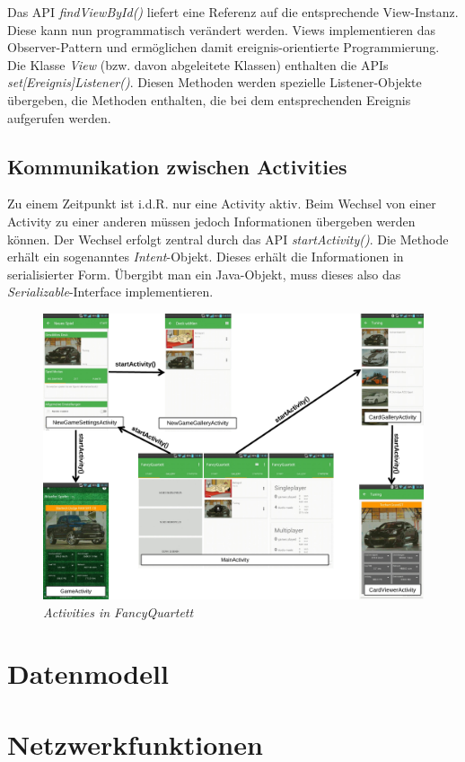 Das API \emph{findViewById()} liefert eine Referenz auf die entsprechende View-Instanz. Diese kann nun programmatisch verändert werden. Views implementieren das Observer-Pattern und ermöglichen damit ereignis-orientierte Programmierung. Die Klasse \emph{View} (bzw. davon abgeleitete Klassen) enthalten die APIs \emph{set[Ereignis]Listener()}. Diesen Methoden werden spezielle Listener-Objekte übergeben, die Methoden enthalten, die bei dem entsprechenden Ereignis aufgerufen werden.

\subsection{Kommunikation zwischen Activities}

Zu einem Zeitpunkt ist i.d.R. nur eine Activity aktiv. Beim Wechsel von einer Activity zu einer anderen müssen jedoch Informationen übergeben werden können. Der Wechsel erfolgt zentral durch das API \emph{startActivity()}. Die Methode erhält ein sogenanntes \emph{Intent}-Objekt. Dieses erhält die Informationen in serialisierter Form. Übergibt man ein Java-Objekt, muss dieses also das \emph{Serializable}-Interface implementieren.

\begin{figure}[ht]
\centering
\includegraphics[width=\textwidth]{../img/Activities.pdf}
\caption{\emph{Activities in FancyQuartett}}
\label{fig:activities}
\end{figure}

\section{Datenmodell}
\label{sec:datenmodell}

\section{Netzwerkfunktionen}
\label{sec:netzwerkfunktionen}